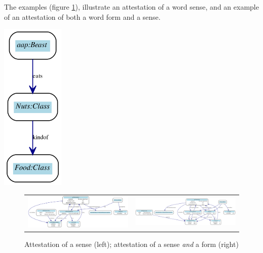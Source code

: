\documentclass[10pt]{article}
\begin{document}
 The examples (figure \ref{fig:ex2}), illustrate an attestation of a word sense, and an example of an attestation of both a word form and a sense.\par

\includegraphics[width=3cm]{voorbeeld1.pdf}




 
 \begin{figure}
 \begin{tabular}{cc}
     	\includegraphics[width=\textheight, angle=90]{./example_1.pdf}  &  
     	\includegraphics[width=\textheight, angle=90]{./example_2.pdf}
 \end{tabular}

\caption{Attestation of a sense (left); attestation of a sense \textit{and} a form (right) }
\label{fig:ex2}
 \end{figure}
\end{document}

